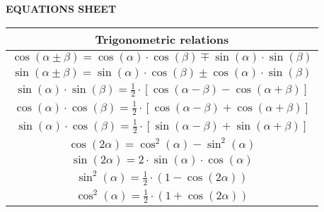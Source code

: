 \documentclass[en]{article}
\begin{document}
\renewcommand{\arraystretch}{1}

\begin{center}

    {\bf EQUATIONS SHEET}
    
    \vspace{0.5cm}

    \renewcommand{\arraystretch}{1.6}
    \begin{tabular}{|c|}
        \multicolumn{1}{c}{{\bf Trigonometric relations}}\\
        \hline 
        $\cos (\alpha \pm \beta) = \cos (\alpha) \cdot \cos (\beta) \mp \sin (\alpha) \cdot \sin (\beta)$ \\
        \hline 
        $\sin (\alpha \pm \beta) = \sin (\alpha) \cdot \cos (\beta) \pm \cos(\alpha) \cdot \sin (\beta)$ \\
        \hline 
        $\sin (\alpha) \cdot \sin (\beta) = \frac{1}{2} \cdot \left [ \cos (\alpha - \beta ) - \cos (\alpha + \beta ) \right ]$ \\ 
        \hline 
        $\cos (\alpha) \cdot \cos (\beta) = \frac{1}{2} \cdot \left [ \cos (\alpha - \beta ) + \cos (\alpha + \beta ) \right ]$ \\
        \hline 
        $\sin (\alpha) \cdot \cos (\beta) = \frac{1}{2} \cdot \left [ \sin (\alpha - \beta ) + \sin (\alpha + \beta ) \right ]$ \\ 
        \hline 
        $\cos (2 \alpha) = \cos^2 (\alpha) - \sin^2 (\alpha)$ \\ 
        \hline 
        $\sin (2 \alpha) = 2 \cdot \sin (\alpha) \cdot \cos (\alpha)$ \\
        \hline 
        $\sin^2 (\alpha) = \frac{1}{2} \cdot \left ( 1 - \cos (2 \alpha) \right )$ \\
        \hline 
        $\cos^2 (\alpha) = \frac{1}{2} \cdot \left ( 1 + \cos (2 \alpha) \right )$ \\
        \hline
    \end{tabular}
    \renewcommand{\arraystretch}{1}
    \vspace{0.5cm}


\end{center}
\end{document}
